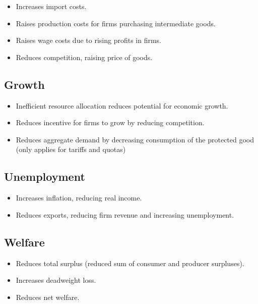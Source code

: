 \documentclass[a4paper,11pt]{article}
\begin{document}
\begin{itemize}
\item Increases import costs.
\item Raises production costs for firms purchasing intermediate goods.
\item Raises wage costs due to rising profits in firms.
\item Reduces competition, raising price of goods.
\end{itemize}


\subsection{Growth}

\begin{itemize}
\item Inefficient resource allocation reduces potential for economic growth.
\item Reduces incentive for firms to grow by reducing competition.
\item Reduces aggregate demand by decreasing consumption of the protected good
	(only applies for tariffs and quotas)
\end{itemize}


\subsection{Unemployment}

\begin{itemize}
\item Increases inflation, reducing real income.
\item Reduces exports, reducing firm revenue and increasing unemployment.
\end{itemize}


\subsection{Welfare}

\begin{itemize}
\item Reduces total surplus (reduced sum of consumer and producer surpluses).
\item Increases deadweight loss.
\item Reduces net welfare.
\end{itemize}
\end{document}
